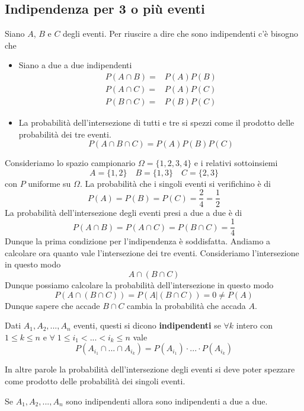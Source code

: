 \subsection{Indipendenza per 3 o più eventi}
Siano $A$, $B$ e $C$ degli eventi. Per riuscire a dire che sono indipendenti c'è bisogno che
\begin{itemize}
	\item Siano a due a due indipendenti
	      \begin{align*}
		      P(A \cap B) = & P(A) P(B) \\
		      P(A \cap C) = & P(A) P(C) \\
		      P(B \cap C) = & P(B) P(C)
	      \end{align*}
	\item La probabilità dell'intersezione di tutti e tre si spezzi come il prodotto delle
	      probabilità dei tre eventi.
	      \[ P(A \cap B \cap C) = P(A) P(B) P(C) \]
\end{itemize}

\begin{example}
	Consideriamo lo spazio campionario $\Omega=\{ 1,2,3,4 \}$ e i relativi sottoinsiemi
	\[ A=\{ 1, 2 \} \quad B=\{ 1, 3 \} \quad C=\{ 2, 3 \} \]
	con $P$ uniforme su $\Omega$. La probabilità che i singoli eventi si verifichino è di
	\[ P(A) = P(B) = P(C) = \frac{2}{4} = \frac{1}{2} \]
	La probabilità dell'intersezione degli eventi presi a due a due è di
	\[ P(A \cap B) = P(A \cap C) = P(B \cap C) = \frac{1}{4} \]
	Dunque la prima condizione per l'indipendenza è soddisfatta. Andiamo a calcolare ora quanto
	vale l'intersezione dei tre eventi. Consideriamo l'intersezione in questo modo
	\[ A \cap (B \cap C) \]
	Dunque possiamo calcolare la probabilità dell'intersezione in questo modo
	\[ P(A \cap (B \cap C)) = P(A | (B \cap C)) = 0 \neq P(A) \]
	Dunque sapere che accade $B \cap C$ cambia la probabilità che accada $A$.
\end{example}

\begin{definition}
	Dati $A_1, A_2, ..., A_n$ eventi, questi si dicono \textbf{indipendenti} se $\forall k$ intero
	con $1 \leq k \leq n$ e $\forall \; 1 \leq i_1 < ... < i_k \leq n$ vale
	\[ P(A_{i_1} \cap ... \cap A_{i_k}) = P(A_{i_1}) \cdot ... \cdot P(A_{i_k}) \]
\end{definition}
In altre parole la probabilità dell'intersezione degli eventi si deve poter spezzare come
prodotto delle probabilità dei singoli eventi.

\begin{observation}
	Se $A_1, A_2, ..., A_n$ sono indipendenti allora sono indipendenti a due a due.
\end{observation}


